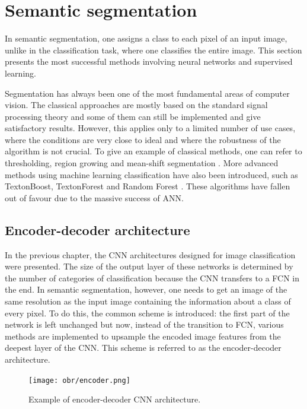 \newpage
\section{Semantic segmentation}

In semantic segmentation, one assigns a class to each pixel of an input image, unlike in the classification task, where one classifies the entire image. This section presents the most successful methods involving neural networks and supervised learning. 

Segmentation has always been one of the most fundamental areas of computer vision. The classical approaches are mostly based on the standard signal processing theory and some of them can still be implemented and give satisfactory results. However, this applies only to a limited number of use cases, where the conditions are very close to ideal and where the robustness of the algorithm is not crucial. To give an example of classical methods, one can refer to thresholding, region growing and mean-shift segmentation \cite{coufal}. More advanced methods using machine learning classification have also been introduced, such as TextonBoost, TextonForest and Random Forest \cite{segnet} \cite{bayesian}. These algorithms have fallen out of favour due to the massive success of ANN.

\subsection{Encoder-decoder architecture}

In the previous chapter, the CNN architectures designed for image classification were presented. The size of the output layer of these networks is determined by the number of categories of classification because the CNN transfers to a FCN in the end. In semantic segmentation, however, one needs to get an image of the same resolution as the input image containing the information about a class of every pixel. To do this, the common scheme is introduced: the first part of the network is left unchanged but now, instead of the transition to FCN, various methods are implemented to upsample the encoded image features from the deepest layer of the CNN. This scheme is referred to as the encoder-decoder architecture. 

\vspace{4mm}
\begin{figure}[h]
	\begin{center}
		\texttt{[image: obr/encoder.png]}
	\end{center}
	\vspace{4mm}
	\caption{Example of encoder-decoder CNN architecture. \cite{zeltner}} 
	\label{encoder}
\end{figure}

